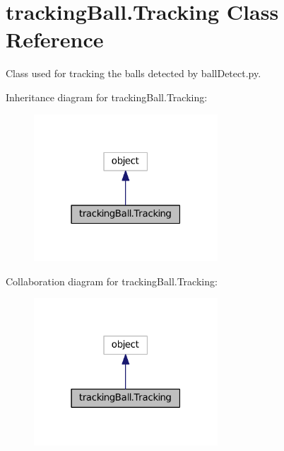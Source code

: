 \hypertarget{classtrackingBall_1_1Tracking}{}\section{tracking\+Ball.\+Tracking Class Reference}
\label{classtrackingBall_1_1Tracking}


Class used for tracking the balls detected by ball\+Detect.\+py.  




Inheritance diagram for tracking\+Ball.\+Tracking\+:\nopagebreak
\begin{figure}[H]
\begin{center}
\leavevmode
\includegraphics[width=195pt]{classtrackingBall_1_1Tracking__inherit__graph}
\end{center}
\end{figure}


Collaboration diagram for tracking\+Ball.\+Tracking\+:\nopagebreak
\begin{figure}[H]
\begin{center}
\leavevmode
\includegraphics[width=195pt]{classtrackingBall_1_1Tracking__coll__graph}
\end{center}
\end{figure}
